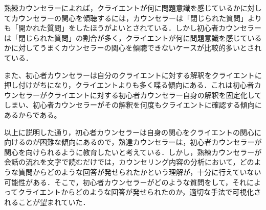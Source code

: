 \documentclass[shuuron]{kuee}
\begin{document}
熟練カウンセラーによれば，クライエントが何に問題意識を感じているかに対してカウンセラーの関心を傾聴するには，カウンセラーは「閉じられた質問」よりも「開かれた質問」をしたほうがよいとされている\cite{ivey}．しかし初心者カウンセラーは「閉じられた質問」の割合が多く，クライエントが何に問題意識を感じているかに対してうまくカウンセラーの関心を傾聴できないケースが比較的多いとされている．


また、初心者カウンセラーは自分のクライエントに対する解釈をクライエントに押し付けがちになり，クライエントよりも多く喋る傾向にある．これは初心者カウンセラーがクライエントに対する初心者カウンセラー自身の解釈を固定化してしまい、初心者カウンセラーがその解釈を何度もクライエントに確認する傾向にあるからである。

以上に説明した通り，初心者カウンセラーは自身の関心をクライエントの関心に向けるのが困難な傾向にあるので，熟達カウンセラーは，初心者カウンセラーが関心を向けられるように教育したいと考えている．しかし，熟練カウンセラーが会話の流れを文字で読むだけでは，カウンセリング内容の分析において，どのような質問からどのような回答が発せられたかという理解が，十分に行えていない可能性がある．そこで，初心者カウンセラーがどのような質問をして，それによってクライエントからどのような回答が発せられたのか，適切な手法で可視化されることが望まれていた．

\end{document}
